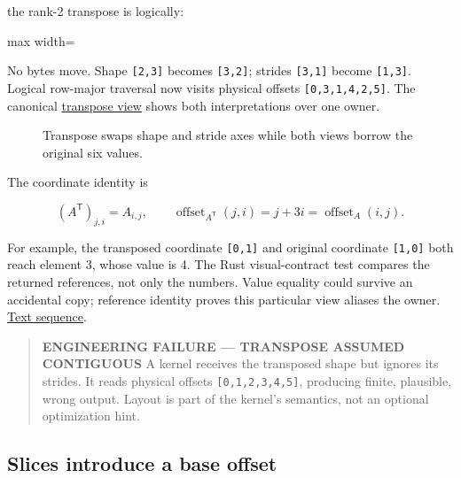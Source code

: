 \documentclass[
  10pt,
]{article}
\begin{document}
the rank-2 transpose is logically:

\begin{center}\begin{adjustbox}{max width=\linewidth}\end{adjustbox}\end{center}

No bytes move. Shape \texttt{{[}2,3{]}} becomes \texttt{{[}3,2{]}};
strides \texttt{{[}3,1{]}} become \texttt{{[}1,3{]}}. Logical row-major
traversal now visits physical offsets \texttt{{[}0,3,1,4,2,5{]}}. The
canonical
\href{https://github.com/hermonai/inside-the-llm-engine/blob/astra-visual-rewrite/diagrams/tensor/transpose-view.txt}{transpose
view} shows both interpretations over one owner.

\begin{figure}[H]\centering\resizebox{\linewidth}{!}{}\caption{Transpose swaps shape and stride axes while both views borrow the original six values.}\end{figure}

The coordinate identity is

\[
(A^{\mathsf T})_{j,i}=A_{i,j},\qquad
\operatorname{offset}_{A^{\mathsf T}}(j,i)=j+3i
=\operatorname{offset}_A(i,j).
\]

For example, the transposed coordinate \texttt{{[}0,1{]}} and original
coordinate \texttt{{[}1,0{]}} both reach element 3, whose value is 4.
The Rust visual-contract test compares the returned references, not only
the numbers. Value equality could survive an accidental copy; reference
identity proves this particular view aliases the owner.
\href{https://github.com/hermonai/inside-the-llm-engine/blob/astra-visual-rewrite/figures/generated/tensor-transpose.txt}{Text
sequence}.

\begin{quote}
\textbf{ENGINEERING FAILURE --- TRANSPOSE ASSUMED CONTIGUOUS} A kernel
receives the transposed shape but ignores its strides. It reads physical
offsets \texttt{{[}0,1,2,3,4,5{]}}, producing finite, plausible, wrong
output. Layout is part of the kernel's semantics, not an optional
optimization hint.
\end{quote}

\subsection{Slices introduce a base
offset}\label{slices-introduce-a-base-offset}
\end{document}
